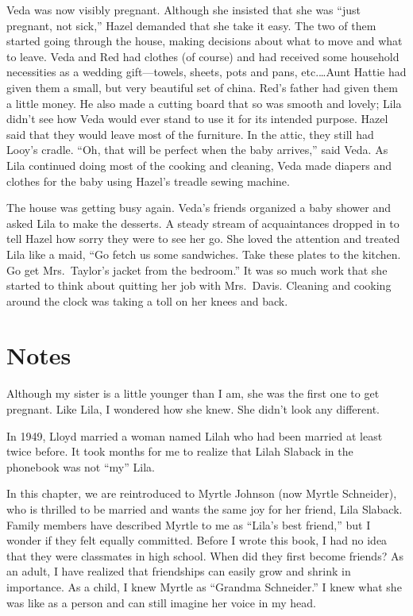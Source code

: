 \documentclass[
  american,
  letterpaper,
]{book}
\begin{document}
Veda was now visibly pregnant. Although she insisted that she was ``just
pregnant, not sick,'' Hazel demanded that she take it easy. The two of
them started going through the house, making decisions about what to
move and what to leave. Veda and Red had clothes (of course) and had
received some household necessities as a wedding gift---towels, sheets,
pots and pans, etc.\ldots Aunt Hattie had given them a small, but very
beautiful set of china. Red's father had given them a little money. He
also made a cutting board that so was smooth and lovely; Lila didn't see
how Veda would ever stand to use it for its intended purpose. Hazel said
that they would leave most of the furniture. In the attic, they still
had Looy's cradle. ``Oh, that will be perfect when the baby arrives,''
said Veda. As Lila continued doing most of the cooking and cleaning,
Veda made diapers and clothes for the baby using Hazel's treadle sewing
machine.

The house was getting busy again. Veda's friends organized a baby shower
and asked Lila to make the desserts. A steady stream of acquaintances
dropped in to tell Hazel how sorry they were to see her go. She loved
the attention and treated Lila like a maid, ``Go fetch us some
sandwiches. Take these plates to the kitchen. Go get Mrs.~Taylor's
jacket from the bedroom.'' It was so much work that she started to think
about quitting her job with Mrs.~Davis. Cleaning and cooking around the
clock was taking a toll on her knees and back.

\section{Notes}\label{notes-26}

Although my sister is a little younger than I am, she was the first one
to get pregnant. Like Lila, I wondered how she knew. She didn't look any
different.

In 1949, Lloyd married a woman named Lilah who had been married at least
twice before. It took months for me to realize that Lilah Slaback in the
phonebook was not ``my'' Lila.

In this chapter, we are reintroduced to Myrtle Johnson (now Myrtle
Schneider), who is thrilled to be married and wants the same joy for her
friend, Lila Slaback. Family members have described Myrtle to me as
``Lila's best friend,'' but I wonder if they felt equally committed.
Before I wrote this book, I had no idea that they were classmates in
high school. When did they first become friends? As an adult, I have
realized that friendships can easily grow and shrink in importance. As a
child, I knew Myrtle as ``Grandma Schneider.'' I knew what she was like
as a person and can still imagine her voice in my head.
\end{document}
